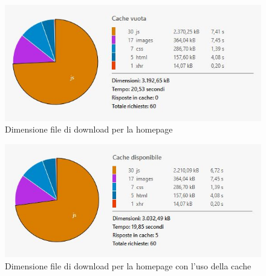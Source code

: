 		\begin{figure}
			\centering
			\includegraphics[scale=0.8]{images/PerformanceEmptyCache}
			\caption{Dimensione file di download per la homepage}
			\label{fig:PerformanceEmptyCache}
		\end{figure}		
		
		\begin{figure}
			\centering
			\includegraphics[scale=0.8]{images/PerformanceWithCache}
			\caption{Dimensione file di download per la homepage con l'uso della cache}
			\label{fig:PerformanceWithCache}
		\end{figure}